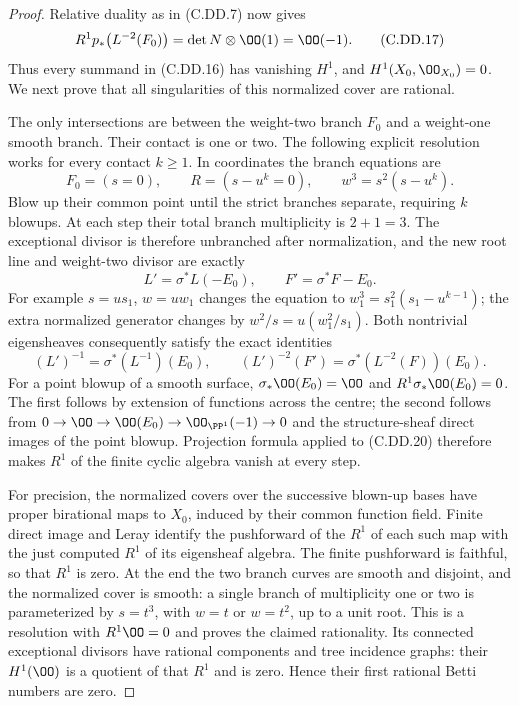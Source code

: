 \begin{proof}
Relative duality as in (C.DD.7) now gives
\[
 R^1p_*\bigl(L^{-2}(F_0)\bigr)
                       =\det N\otimes\OO(1)=\OO(-1).
\tag{C.DD.17}
\]
Thus every summand in (C.DD.16) has vanishing
$H^1$, and $H^1(X_0,\OO_{X_0})=0$.
We next prove that all singularities of this
normalized cover are rational.

The only intersections are between the weight-two
branch $F_0$ and a weight-one smooth branch. Their
contact is one or two. The following explicit
resolution works for every contact $k\ge1$.
In coordinates the branch equations are
\[
                F_0=(s=0),\qquad R=(s-u^k=0),
                \qquad w^3=s^2(s-u^k).
\tag{C.DD.18}
\]
Blow up their common point until the strict
branches separate, requiring $k$ blowups. At
each step their total branch multiplicity is
$2+1=3$. The exceptional divisor is therefore
unbranched after normalization, and the new
root line and weight-two divisor are exactly
\[
 L'=\sigma^*L(-E_0),\qquad
 F'=\sigma^*F-E_0.
\tag{C.DD.19}
\]
For example $s=u s_1$, $w=u w_1$ changes the
equation to
$w_1^3=s_1^2(s_1-u^{k-1})$; the extra normalized
generator changes by
$w^2/s=u(w_1^2/s_1)$.
Both nontrivial eigensheaves consequently satisfy
the exact identities
\[
 (L')^{-1}=\sigma^*(L^{-1})(E_0),\qquad
 (L')^{-2}(F')=\sigma^*(L^{-2}(F))(E_0).
\tag{C.DD.20}
\]
For a point blowup of a smooth surface,
$\sigma_*\OO(E_0)=\OO$ and
$R^1\sigma_*\OO(E_0)=0$.
The first follows by extension of functions across
the centre; the second follows from
$0\to\OO\to\OO(E_0)\to\OO_{\PP^1}(-1)\to0$
and the structure-sheaf direct images of the
point blowup. Projection formula applied to
(C.DD.20) therefore makes $R^1$ of the finite
cyclic algebra vanish at every step.

For precision, the normalized covers over the
successive blown-up bases have proper birational
maps to $X_0$, induced by their common function
field. Finite direct image and Leray identify the
pushforward of the $R^1$ of each such map with
the just computed $R^1$ of its eigensheaf algebra.
The finite pushforward is faithful, so that $R^1$
is zero. At the end the two branch curves are
smooth and disjoint, and the normalized cover
is smooth: a single branch of multiplicity one
or two is parameterized by $s=t^3$, with $w=t$
or $w=t^2$, up to a unit root. This is a resolution
with $R^1\OO=0$ and proves the claimed rationality.
Its connected exceptional divisors have rational
components and tree incidence graphs: their
$H^1(\OO)$ is a quotient of that $R^1$ and is zero.
Hence their first rational Betti numbers are zero.


\end{proof}
